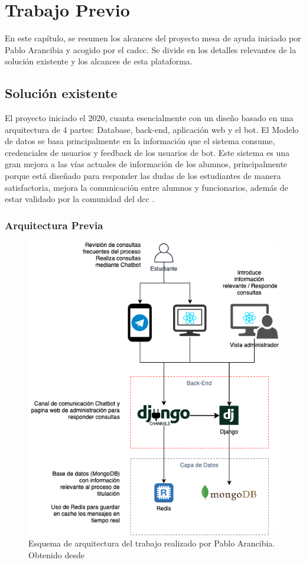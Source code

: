 \chapter{Trabajo Previo}
 En este capítulo, se resumen los alcances del proyecto mesa de ayuda iniciado por Pablo Arancibia y acogido por el \acrshort{cadcc}. Se divide en los detalles relevantes de la solución existente y los alcances de esta plataforma.
\section{Solución existente}
    El proyecto iniciado el 2020, cuanta esencialmente con un diseño basado en una arquitectura de 4 partes: Database, back-end, aplicación web y el bot. El Modelo de datos se basa principalmente en la información que el sistema consume, credenciales de usuarios y feedback de los usuarios de bot. Este sistema es una gran mejora a las vías actuales de información de los alumnos, principalmente porque está diseñado para responder las dudas de los estudiantes de manera satisfactoria, mejora la comunicación entre alumnos y funcionarios, además de estar validado por la comunidad del \acrshort{dcc} \cite{ARANCIBIA2021}.

    \subsection{Arquitectura Previa}
        \begin{figure}[h]
            \centering
            \includegraphics[scale=0.5]{media/imagenes/trabajo_previo/arquitectura_del_sistema.png}
            \caption[Arquitectura sistema anterior]{Esquema de arquitectura del trabajo realizado por Pablo Arancibia. Obtenido desde \cite{ARANCIBIA2021}}
            \label{fig:arc-previa}
        \end{figure}

